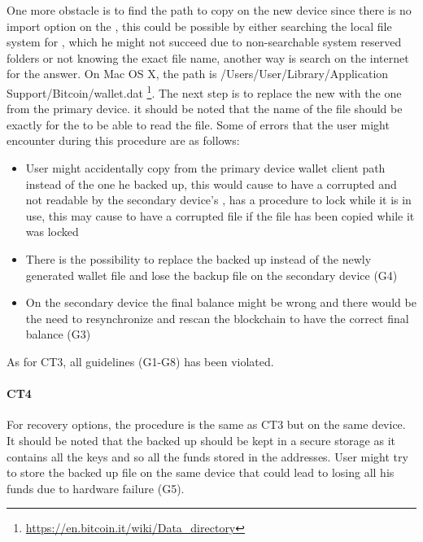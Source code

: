 One more obstacle is to find the path to copy \walletfile on the new device since there is no import option on the \bitcoinclient, this could be possible by either searching the local file system for \walletfile, which he might not succeed due to non-searchable system reserved folders or not knowing the exact file name, another way is search on the internet for the answer. On Mac OS X, the path is /Users/User/Library/Application Support/Bitcoin/wallet.dat \footnote{\url{https://en.bitcoin.it/wiki/Data_directory}}. The next step is to replace the new \walletfile with the one from the primary device. it should be noted that the name of the file should be exactly \walletfile for the \bitcoinclient to be able to read the file. Some of errors that the user might encounter during this procedure are as follows:
\begin{itemize}
	\item User might accidentally copy \walletfile from the primary device wallet client path instead of the one he backed up, this would cause to have a corrupted \walletfile and not readable by the secondary device's \bitcoinclient, \bitcoinclient has a procedure to lock \walletfile while it is in use, this may cause to have a corrupted file if the file has been copied while it was locked %
	\item There is the possibility to replace the backed up \walletfile instead of the newly generated wallet file and lose the backup file on the secondary device (G4)
	\item On the secondary device the final balance might be wrong and there would be the need to resynchronize and rescan the blockchain to have the correct final balance (G3)
\end{itemize}
As for CT3, all guidelines (G1-G8) has been violated.\

\paragraph{CT4} For recovery options, the procedure is the same as CT3 but on the same device. It should be noted that the backed up \walletfile should be kept in a secure storage %
as it contains all the keys and so all the funds stored in the addresses. User might try to store the backed up file on the same device that could lead to losing all his funds due to hardware failure (G5).


